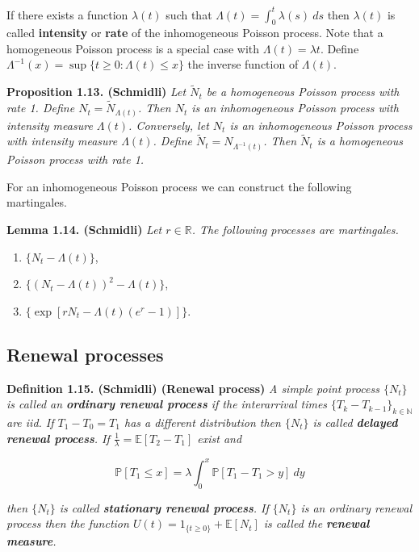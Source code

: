 \documentclass[a4paper,12pt,openany]{book}
\providecommand{\tightlist}{%
 \setlength{\itemsep}{0pt}\setlength{\parskip}{0pt}}
\begin{document}
If there exists a function \(\lambda(t)\) such that \(\Lambda(t) = \int_0^t \lambda(s)\ ds\) then \(\lambda(t)\) is called \textbf{intensity} or \textbf{rate} of the inhomogeneous Poisson process. Note that a homogeneous Poisson process is a special case with \(\Lambda(t) = \lambda t\). Define \(\Lambda^{−1}(x) = \sup\{t \ge 0 : \Lambda(t) \le x\}\) the inverse function of \(\Lambda(t)\).

\textbf{Proposition 1.13. (Schmidli)} \emph{Let \(\tilde N_t\) be a homogeneous Poisson process with rate 1. Define \(N_t=\tilde N_{\Lambda (t)}\). Then \(N_t\) is an inhomogeneous Poisson process with intensity measure \(\Lambda(t)\). Conversely, let \(N_t\) is an inhomogeneous Poisson process with intensity measure \(\Lambda(t)\). Define \(\tilde N_t=N_{\Lambda^{-1}(t)}\). Then \(\tilde N_t\) is a homogeneous Poisson process with rate 1.}

For an inhomogeneous Poisson process we can construct the following martingales.

\textbf{Lemma 1.14. (Schmidli)} \emph{Let \(r\in \mathbb R\). The following processes are martingales.}

\begin{enumerate}
\def\labelenumi{\roman{enumi})}
\tightlist
\item
  \(\{N_t-\Lambda(t)\}\),
\item
  \(\{(N_t-\Lambda(t))^2-\Lambda(t)\}\),
\item
  \(\{\exp[rN_t-\Lambda(t)(e^r-1)]\}\).
\end{enumerate}

\hypertarget{renewal-processes}{%
\subsection{Renewal processes}\label{renewal-processes}}

\textbf{Definition 1.15. (Schmidli) (Renewal process)} \emph{A simple point process \(\{N_t\}\) is called an \textbf{ordinary renewal process} if the interarrival times \(\{T_k-T_{k-1}\}_{k\in\mathbb N}\) are iid. If \(T_1-T_0=T_1\) has a different distribution then \(\{N_t\}\) is called \textbf{delayed renewal process}. If \(\frac{1}{\lambda}=\mathbb E[T_2-T_1]\) exist and}

\[
\mathbb P[T_1\le x]=\lambda\int_0^x\mathbb P[T_1-T_1>y]\ dy
\]

\emph{then \(\{N_t\}\) is called \textbf{stationary renewal process}. If \(\{N_t\}\) is an ordinary renewal process then the function \(U(t)=1_{\{t\ge 0\}}+\mathbb E[N_t]\) is called the \textbf{renewal measure}.}
\end{document}
